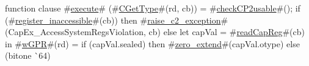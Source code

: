 function clause #\hyperref[zexecute]{execute}# (#\hyperref[zCGetType]{CGetType}#(rd, cb)) =
{
  #\hyperref[zcheckCPtwousable]{checkCP2usable}#();
  if (#\hyperref[zregisterzyinaccessible]{register\_inaccessible}#(cb)) then
    #\hyperref[zraisezyctwozyexception]{raise\_c2\_exception}#(CapEx_AccessSystemRegsViolation, cb)
  else
    let capVal = #\hyperref[zreadCapReg]{readCapReg}#(cb) in
    #\hyperref[zwGPR]{wGPR}#(rd) = if (capVal.sealed)
      then #\hyperref[zzzerozyextend]{zero\_extend}#(capVal.otype)
      else (bitone ^^ 64)
}

